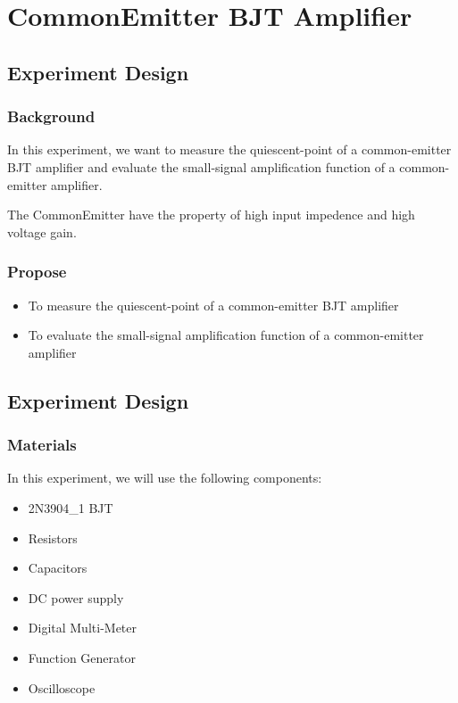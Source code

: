 \section{Common\-Emitter BJT Amplifier}

\subsection{Experiment Design}
    \subsubsection{Background}
    In this experiment, we want to measure the quiescent-point of a common-emitter BJT amplifier and evaluate the small-signal amplification function of a common-emitter amplifier.\par

    The Common\-Emitter have the property of high input impedence and high voltage gain.\par

    \subsubsection{Propose}
    \begin{itemize}
        \item To measure the quiescent-point of a common-emitter BJT amplifier
        \item To evaluate the small-signal amplification function of a common-emitter amplifier
    \end{itemize}

\subsection{Experiment Design}
    \subsubsection{Materials}
        In this experiment, we will use the following components:
        \begin{itemize}
            \item 2N3904\_1 BJT
            \item Resistors
            \item Capacitors
            \item DC power supply
            \item Digital Multi-Meter
            \item Function Generator
            \item Oscilloscope
        \end{itemize}

